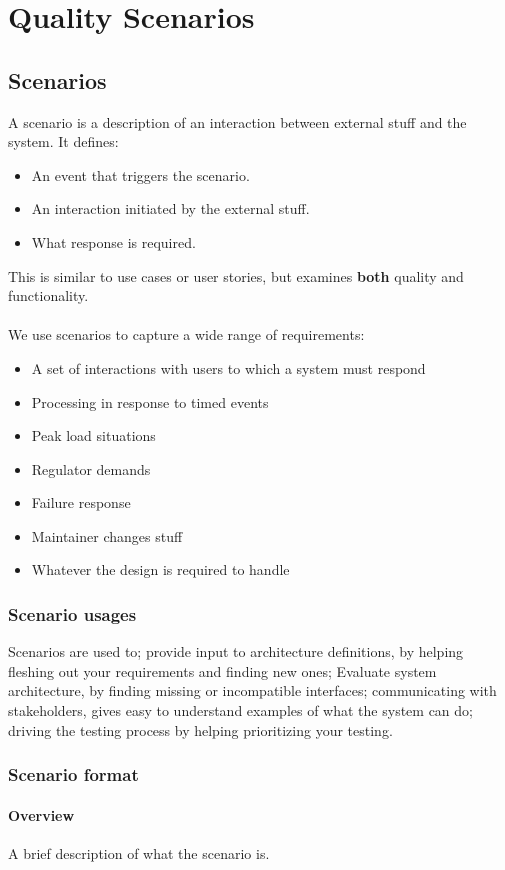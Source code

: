 \chapter{Quality Scenarios}
\section{Scenarios}
A scenario is a description of an interaction between external stuff and the system. It defines:
\begin{itemize}
	\item An event that triggers the scenario.
	\item An interaction initiated by the external stuff.
	\item What response is required.
\end{itemize}
This is similar to use cases or user stories, but examines \textbf{both} quality and functionality.\\
\\
We use scenarios to capture a wide range of requirements:\begin{itemize}
	\item A set of interactions with users to which a system must respond
	\item Processing in response to timed events
	\item Peak load situations
	\item Regulator demands
	\item Failure response
	\item Maintainer changes stuff
	\item Whatever the design is required to handle
\end{itemize}
\subsection{Scenario usages}
Scenarios are used to; provide input to architecture definitions, by helping fleshing out your requirements and finding new ones; Evaluate system architecture, by finding missing or incompatible interfaces; communicating with stakeholders, gives easy to understand examples of what the system can do; driving the testing process by helping prioritizing your testing.

\subsection{Scenario format}
\subsubsection{Overview}
A brief description of what the scenario is.

